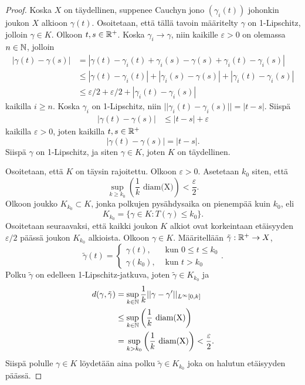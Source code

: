 \documentclass[12pt,oneside,a4paper]{amsbook} %
\begin{document}
\begin{proof}
    Koska $X$ on täydellinen, suppenee Cauchyn jono $(\gamma_i(t))$ johonkin joukon $X$ alkioon $\gamma(t)$. Osoitetaan, että tällä tavoin määritelty $\gamma$ on 1-Lipschitz, jolloin $\gamma \in K$. Olkoon $t, s \in {\mathbb{R}^{+}}$. Koska $\gamma_i \to \gamma$, niin kaikille $\varepsilon > 0$ on olemassa $n\in \mathbb{N}$, jolloin
    \begin{align*}
        |\gamma(t) - \gamma(s)| &= |\gamma(t) - \gamma_i(t) + \gamma_i(s) - \gamma(s) + \gamma_i(t) - \gamma_i(s)| \\
        &\le  |\gamma(t) - \gamma_i(t)| + |\gamma_i(s) - \gamma(s)| + |\gamma_i(t) - \gamma_i(s)| \\
        &\le \varepsilon/2 + \varepsilon/2 + |\gamma_i(t) - \gamma_i(s)|
    \end{align*}
    kaikilla $i \ge n$. Koska $\gamma_i$ on 1-Lipschitz, niin $||\gamma_i(t) - \gamma_i(s)|| = |t-s|$. Siispä
    \begin{align*}
        |\gamma(t) - \gamma(s)| &\le |t-s| + \varepsilon
    \end{align*}
    kaikilla $\varepsilon > 0$, joten kaikilla $t,s \in {\mathbb{R}^{+}}$
    \begin{equation*}
        |\gamma(t)-\gamma(s)| = |t-s|.
    \end{equation*}
    Siispä $\gamma$ on 1-Lipschitz, ja siten $\gamma \in K$, joten $K$ on täydellinen.
    
    Osoitetaan, että $K$ on täysin rajoitettu. Olkoon $\varepsilon > 0$. Asetetaan $k_0$ siten, että 
    \begin{equation*}
        \sup_{k\ge k_0} \left(\frac{1}{k}\text{ diam(X)}\right) < \frac{\varepsilon}{2}.
    \end{equation*}
    Olkoon joukko $K_{k_0} \subset K$, jonka polkujen pysähdysaika on pienempää kuin $k_0$, eli
    \begin{equation*}
        K_{k_0} = \{\gamma \in K : T(\gamma) \le k_0\}.
    \end{equation*}
    Osoitetaan seuraavaksi, että kaikki joukon $K$ alkiot ovat korkeintaan etäisyyden $\varepsilon/2$ päässä joukon $K_{k_0}$ alkioista.
        Olkoon $\gamma \in K$. Määritellään $\tilde \gamma : {\mathbb{R}^{+}} \to X$,
    \begin{equation*}
        \tilde\gamma(t) = \begin{cases}
            \gamma(t), &\text{ kun } 0 \le t \le k_0 \\
            \gamma(k_0), &\text{ kun } t > k_0
        \end{cases}.
    \end{equation*}
    Polku $\tilde\gamma$ on edelleen 1-Lipschitz-jatkuva, joten $\tilde\gamma \in K_{k_0}$ ja 
    \begin{align*}
        d(\gamma, \tilde\gamma) &= \sup_{k \in \mathbb{N}} \frac{1}{k}||\gamma - \gamma'||_{L^\infty[0, k]} \\
        &\le \sup_{k \in \mathbb{N}} \left(\frac{1}{k}\text{ diam(X)}\right)\\
        &= \sup_{k > k_0} \left(\frac{1}{k}\text{ diam(X)}\right) < \frac{\varepsilon}{2}.
    \end{align*}
    Siispä polulle $\gamma \in K$ löydetään aina polku $\tilde\gamma \in K_{k_0}$ joka on halutun etäisyyden päässä.
    

\end{proof}
\end{document}

